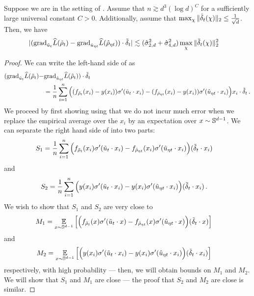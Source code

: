 \begin{lemma} \label{lemma:discretized_gradient_concentration}
Suppose we are in the setting of . Assume that $n \gtrsim d^3 (\log d)^C$ for a sufficiently large universal constant $C > 0$. Additionally, assume that $\max_\chi \|{\tilde{\delta}}_t(\chi)\|_2 \leq \frac{1}{\sqrt{d}}$. Then, we have
\begin{align} \label{eq:discretized_gradient_error1}
|({\textup{grad}}_{\tilde{u}_t} \widehat{L}({\tilde{\rho}}_t) - {\textup{grad}}_{\hat{u}_{\eta t}} \widehat{L}({\hat{\rho}}_{\eta t})) \cdot {\tilde{\delta}}_t|
& \lesssim (\hat{\sigma}_{2, d}^2 + \hat{\sigma}_{4, d}^2) \max_\chi \|{\tilde{\delta}}_t (\chi)\|_2^2
\end{align}
\end{lemma}
\begin{proof}
We can write the left-hand side of  as
\begin{align} \label{eq:empirical_gradient_dot_product_diff}
({\textup{grad}}_{\tilde{u}_t} \widehat{L}({\tilde{\rho}}_t) - & {\textup{grad}}_{\hat{u}_{\eta t}} \widehat{L}({\hat{\rho}}_t)) \cdot {\tilde{\delta}}_t \\
& = \frac{1}{n} \sum_{i = 1}^n \Big((f_{{\tilde{\rho}}_t}(x_i) - y(x_i)) \sigma'(\tilde{u}_t \cdot x_i) - (f_{{\hat{\rho}}_{\eta t}}(x_i) - y(x_i)) \sigma'(\hat{u}_{\eta t} \cdot x_i) \Big) x_i \cdot {\tilde{\delta}}_t \,.
\end{align}
We proceed by first showing using  that we do not incur much error when we replace the empirical average over the $x_i$ by an expectation over $x \sim \mathbb{S}^{d - 1}$. We can separate the right hand side of  into two parts:
\begin{align}
S_1 
& = \frac{1}{n} \sum_{i = 1}^n \Big(f_{{\tilde{\rho}}_t}(x_i) \sigma'(\tilde{u}_t \cdot x_i) - f_{{\hat{\rho}}_{\eta t}}(x_i) \sigma'(\hat{u}_{\eta t} \cdot x_i) \Big) ({\tilde{\delta}}_t \cdot x_i)
\end{align}
and
\begin{align}
S_2
& = \frac{1}{n} \sum_{i = 1}^n \Big(y(x_i) \sigma'(\tilde{u}_t \cdot x_i) - y(x_i) \sigma'(\hat{u}_{\eta t} \cdot x_i) \Big) ({\tilde{\delta}}_t \cdot x_i) \,.
\end{align}
We wish to show that $S_1$ and $S_2$ are very close to
\begin{align}
M_1
& = \operatorname*{\mathbb{E}}_{x \sim \mathbb{S}^{d - 1}} \Big[\Big(f_{{\tilde{\rho}}_t}(x) \sigma'(\tilde{u}_t \cdot x) - f_{{\hat{\rho}}_{\eta t}}(x) \sigma'(\hat{u}_{\eta t} \cdot x) \Big) ({\tilde{\delta}}_t \cdot x)\Big]
\end{align}
and
\begin{align}
M_2
& = \operatorname*{\mathbb{E}}_{x \sim \mathbb{S}^{d - 1}} \Big[\Big(y(x_i) \sigma'(\tilde{u}_t \cdot x_i) - y(x_i) \sigma'(\hat{u}_{\eta t} \cdot x_i) \Big) ({\tilde{\delta}}_t \cdot x_i)\Big]
\end{align}
respectively, with high probability --- then, we will obtain bounds on $M_1$ and $M_2$. We will show that $S_1$ and $M_1$ are close --- the proof that $S_2$ and $M_2$ are close is similar.


\end{proof}
